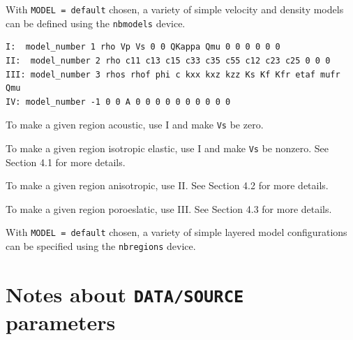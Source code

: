 \documentclass[oneside,english,onecolumn,letterpaper]{book}
\begin{document}
\begin{description}[font=\ttfamily]
\item[nbmodels]  With \texttt{MODEL = default} chosen, a variety of simple velocity and density models can be defined using the \texttt{nbmodels} device.

%
\begin{verbatim}
I:  model_number 1 rho Vp Vs 0 0 QKappa Qmu 0 0 0 0 0 0
II:  model_number 2 rho c11 c13 c15 c33 c35 c55 c12 c23 c25 0 0 0
III: model_number 3 rhos rhof phi c kxx kxz kzz Ks Kf Kfr etaf mufr Qmu
IV: model_number -1 0 0 A 0 0 0 0 0 0 0 0 0 0
\end{verbatim}
%

To make a given region acoustic, use I and make \texttt{Vs} be zero.

To make a given region isotropic elastic, use I and make \texttt{Vs} be nonzero.  See Section 4.1 for more details.

To make a given region anisotropic, use II.  See Section 4.2 for more details.

To make a given region poroeslatic, use III.  See Section 4.3 for more details.


\item[nbregions]  With \texttt{MODEL = default} chosen, a variety of simple layered model configurations can be specified using the \texttt{nbregions} device.



\end{description}

\section*{Notes about \texttt{DATA/SOURCE} parameters}
\end{document}
